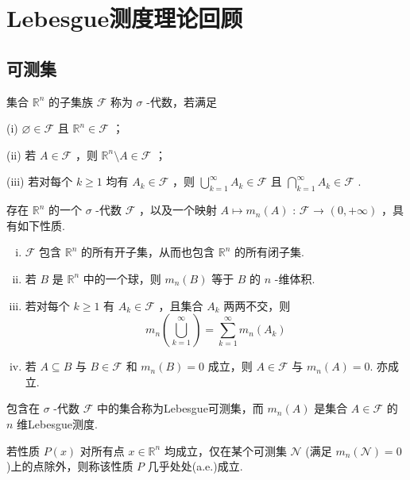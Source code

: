 \section{Lebesgue测度理论回顾}

\subsection{可测集}
集合 ${\mathbb{R}}^{n}$ 的子集族 $\mathcal{F}$ 称为 $\sigma$ -代数，若满足

(i) $\varnothing  \in  \mathcal{F}$ 且 ${\mathbb{R}}^{n} \in  \mathcal{F}$ ；

(ii) 若 $A \in  \mathcal{F}$ ，则 ${\mathbb{R}}^{n} \setminus  A \in  \mathcal{F}$ ；

(iii) 若对每个 $k \geq  1$ 均有 ${A}_{k} \in  \mathcal{F}$ ，则 $\mathop{\bigcup }\limits_{{k = 1}}^{\infty }{A}_{k} \in  \mathcal{F}$ 且 $\mathop{\bigcap }\limits_{{k = 1}}^{\infty }{A}_{k} \in  \mathcal{F}$ .

\begin{theorem}\label{thm:app-A-6}
存在 ${\mathbb{R}}^{n}$ 的一个 $\sigma$ -代数 $\mathcal{F}$ ，以及一个映射 $A \mapsto  {m}_{n}\left( A\right)$ : $\mathcal{F}$ → $\left(  {0, + \infty }\right)$ ，具有如下性质.
\begin{enumerate}[(i)]
    \item $\mathcal{F}$ 包含 ${\mathbb{R}}^{n}$ 的所有开子集，从而也包含 ${\mathbb{R}}^{n}$ 的所有闭子集.
    \item 若 $B$ 是 ${\mathbb{R}}^{n}$ 中的一个球，则 ${m}_{n}\left( B\right)$ 等于 $B$ 的 $n$ -维体积.
    \item 若对每个 $k \geq  1$ 有 ${A}_{k} \in  \mathcal{F}$ ，且集合 ${A}_{k}$ 两两不交，则
\[
{m}_{n}\left( \mathop{\bigcup }\limits_{{k = 1}}^{\infty }\right)  = \sum_{{k = 1}}^{\infty }{m}_{n}\left( {A}_{k}\right)
\]
    \item 若 $A \subseteq  B$ 与 $B \in  \mathcal{F}$ 和 ${m}_{n}\left( B\right)  = 0$ 成立，则 $A \in  \mathcal{F}$ 与 ${m}_{n}\left( A\right)  = 0.$ 亦成立.
\end{enumerate}
\end{theorem}

包含在 $\sigma$ -代数 $\mathcal{F}$ 中的集合称为Lebesgue可测集，而 ${m}_{n}\left( A\right)$ 是集合 $A \in  \mathcal{F}$ 的 $n$ 维Lebesgue测度.

若性质 $P\left( x\right)$ 对所有点 $x \in  {\mathbb{R}}^{n}$ 均成立，仅在某个可测集 $\mathcal{N}$ (满足 ${m}_{n}\left( \mathcal{N}\right)  = 0$ )上的点除外，则称该性质 $P$ 几乎处处(a.e.)成立.

